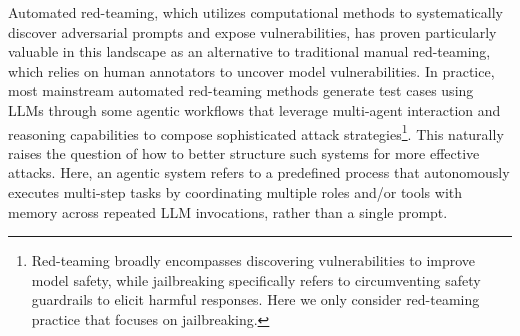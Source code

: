 Automated red-teaming, which utilizes computational methods to systematically discover adversarial prompts and expose vulnerabilities, has proven particularly valuable in this landscape as an alternative to traditional manual red-teaming, which relies on human annotators to uncover model vulnerabilities. 
In practice, most mainstream automated red-teaming methods generate test cases using LLMs through some agentic workflows that leverage multi-agent interaction and reasoning capabilities to compose sophisticated attack strategies\footnote{Red-teaming broadly encompasses discovering vulnerabilities to improve model safety, while jailbreaking specifically refers to circumventing safety guardrails to elicit harmful responses. Here we only consider red-teaming practice that focuses on jailbreaking.}\citep{sabbaghi2025adversarial,liu2025chasingmovingtargetsonline,xiong2025copagenticredteaminglarge, zhou2025autoredteamer}. This naturally raises the question of how to better structure such systems for more effective attacks. Here, an agentic system refers to a predefined process that autonomously executes multi-step tasks by coordinating multiple roles and/or tools with memory across repeated LLM invocations, rather than a single prompt. 
